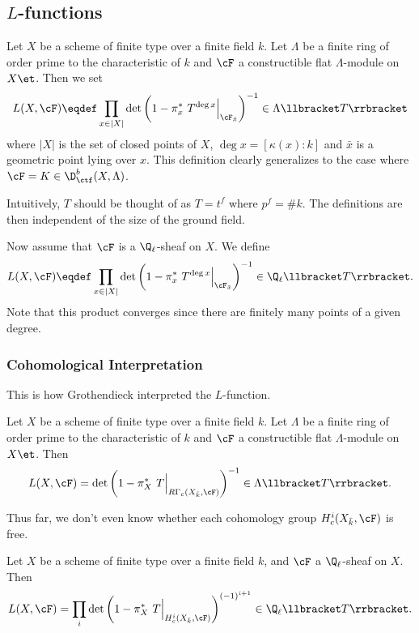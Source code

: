 \subsection{$L$-functions} 

\begin{defi}
Let $X$ be a scheme of finite type over a finite field $k$. Let $\Lambda$ be a finite ring of order prime to the characteristic of $k$ and $\cF$ a constructible flat $\Lambda$-module on $X\et$. Then we set
$$
L(X, \cF) \eqdef \prod_{x\in |X|}\det\left(1-\pi_x^*\ T^{\deg x}\Big|_{\cF_{\bar x}}\right)^{-1}\in \Lambda \llbracket T \rrbracket
$$
where $|X|$ is the set of closed points of $X$, $\deg x = [\kappa(x): k]$ and $\bar x$ is a geometric point lying over $x$. This definition clearly generalizes to the case where $\cF =K \in \D_{\ctf}^b(X, \Lambda)$. 

\begin{remark}
Intuitively, $T$ should be thought of as $T = t^f$ where $p^f = \# k$. The definitions are then independent of the size of the ground field.
\end{remark}

Now assume that $\cF$ is a $\Q_\ell$-sheaf on $X$. We define
$$
L(X, \cF) \eqdef \prod_{x\in |X|}\det\left(1-\pi_x^*\ T^{\deg x}\Big|_{\cF_{\bar x}}\right)^{-1}\in \Q_\ell \llbracket T \rrbracket.
$$
Note that this product converges since there are finitely many points of a given degree.
\end{defi}

\subsubsection*{Cohomological Interpretation} 

This is how Grothendieck interpreted the $L$-function.

\begin{thm} \label{thmA} 
Let $X$ be a scheme of finite type over a finite field $k$. Let $\Lambda$ be a finite ring of order prime to the characteristic of $k$ and $\cF$ a constructible flat $\Lambda$-module on $X\et$. Then
$$
L(X, \cF) = \det\left(1-\pi_X^*\ T\Big|_{R\Gamma_c(X_{\bar k}, \cF)}\right)^{-1}\in \Lambda\llbracket T\rrbracket.
$$
\end{thm}

Thus far, we don't even know whether each cohomology group $H^i_c(X_{\bar k}, \cF)$ is free.

\begin{thm} \label{thmB} 
Let $X$ be a scheme of finite type over a finite field $k$, and $\cF$ a $\Q_\ell$-sheaf on $X$. Then
$$
L(X, \cF) = \prod_i \det\left(1-\pi_X^*\ T\Big|_{H_c^i\left(X_{\bar k} , \cF\right)}\right)^{(-1)^{i+1}}
\in \Q_\ell\llbracket T\rrbracket. 
$$
\end{thm}


